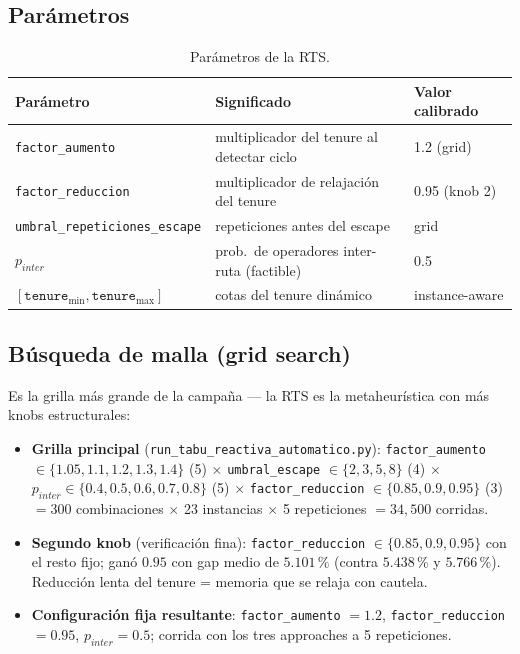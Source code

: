\subsection{Parámetros}
\begin{table}[htbp]
\centering
\caption{Parámetros de la RTS.}
\begin{tabular}{lll}
\toprule
Parámetro & Significado & Valor calibrado \\
\midrule
\texttt{factor\_aumento} & multiplicador del tenure al detectar ciclo & 1.2 (grid) \\
\texttt{factor\_reduccion} & multiplicador de relajación del tenure & 0.95 (knob 2) \\
\texttt{umbral\_repeticiones\_escape} & repeticiones antes del escape & grid \\
$p_{inter}$ & prob.\ de operadores inter-ruta (factible) & 0.5 \\
$[\texttt{tenure}_{\min}, \texttt{tenure}_{\max}]$ & cotas del tenure dinámico & instance-aware \\
\bottomrule
\end{tabular}
\end{table}

\subsection{Búsqueda de malla (grid search)}
Es la grilla más grande de la campaña --- la RTS es la metaheurística con más
knobs estructurales:
\begin{itemize}
  \item \textbf{Grilla principal} (\texttt{run\_tabu\_reactiva\_automatico.py}):
    \texttt{factor\_aumento} $\in \{1.05, 1.1, 1.2, 1.3, 1.4\}$ (5) $\times$
    \texttt{umbral\_escape} $\in \{2, 3, 5, 8\}$ (4) $\times$
    $p_{inter} \in \{0.4, 0.5, 0.6, 0.7, 0.8\}$ (5) $\times$
    \texttt{factor\_reduccion} $\in \{0.85, 0.9, 0.95\}$ (3)
    $= 300$ combinaciones $\times$ 23 instancias $\times$ 5 repeticiones
    $= 34{,}500$ corridas.
  \item \textbf{Segundo knob} (verificación fina): \texttt{factor\_reduccion}
    $\in \{0.85, 0.9, 0.95\}$ con el resto fijo; ganó $0.95$ con gap medio de
    $5.101\,\%$ (contra $5.438\,\%$ y $5.766\,\%$). Reducción lenta del tenure
    = memoria que se relaja con cautela.
  \item \textbf{Configuración fija resultante}: \texttt{factor\_aumento} $=
    1.2$, \texttt{factor\_reduccion} $= 0.95$, $p_{inter} = 0.5$; corrida con
    los tres approaches a 5 repeticiones.
\end{itemize}

